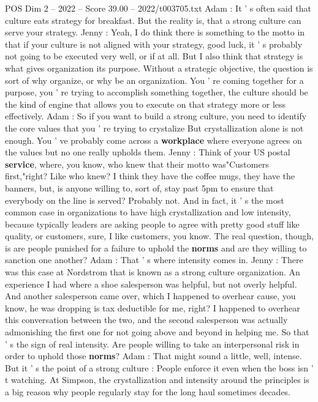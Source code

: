 \begin{textsample}{POS Dim 2 – 2022 – Score 39.00 – 2022/t003705.txt}
Adam : It ' s often said that culture eats strategy for breakfast.
But the reality is, that a strong culture can serve your strategy.
Jenny : Yeah, I do think there is something to the motto in that if your culture is not aligned with your strategy, good luck, it ' s probably not going to be executed very well, or if at all.
But I also think that strategy is what gives organization its purpose.
Without a strategic objective, the question is sort of why organize, or why be an organization.
You ' re coming together for a purpose, you ' re trying to accomplish something together, the culture should be the kind of engine that allows you to execute on that strategy more or less effectively.
Adam : So if you want to build a strong culture, you need to identify the core values that you ' re trying to crystalize But crystallization alone is not enough.
You ' ve probably come across a \textbf{workplace} where everyone agrees on the values but no one really upholds them.
Jenny : Think of your US postal \textbf{service}, where, you know, who knew that their motto was"Customers first,"right?
Like who knew?
I think they have the coffee mugs, they have the banners, but, is anyone willing to, sort of, stay past 5pm to ensure that everybody on the line is served?
Probably not.
And in fact, it ' s the most common case in organizations to have high crystallization and low intensity, because typically leaders are asking people to agree with pretty good stuff like quality, or customers, sure, I like customers, you know.
The real question, though, is are people punished for a failure to uphold the \textbf{norms} and are they willing to sanction one another?
Adam : That ' s where intensity comes in.
Jenny : There was this case at Nordstrom that is known as a strong culture organization.
An experience I had where a shoe salesperson was helpful, but not overly helpful.
And another salesperson came over, which I happened to overhear cause, you know, he was dropping is tax deductible for me, right?
I happened to overhear this conversation between the two, and the second salesperson was actually admonishing the first one for not going above and beyond in helping me.
So that ' s the sign of real intensity.
Are people willing to take an interpersonal risk in order to uphold those \textbf{norms}?
Adam : That might sound a little, well, intense.
But it ' s the point of a strong culture : People enforce it even when the boss isn ' t watching.
At Simpson, the crystallization and intensity around the principles is a big reason why people regularly stay for the long haul sometimes decades.

\end{textsample}
